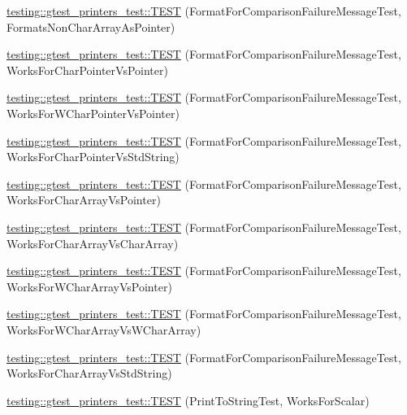 \begin{DoxyCompactItemize}
\item 
\hyperlink{namespacetesting_1_1gtest__printers__test_a3571808f93f419268b6aed1aa127ea30}{testing\+::gtest\+\_\+printers\+\_\+test\+::\+T\+E\+ST} (Format\+For\+Comparison\+Failure\+Message\+Test, Formats\+Non\+Char\+Array\+As\+Pointer)
\item 
\hyperlink{namespacetesting_1_1gtest__printers__test_a1694d4063da702f5379495d3cb2cbc91}{testing\+::gtest\+\_\+printers\+\_\+test\+::\+T\+E\+ST} (Format\+For\+Comparison\+Failure\+Message\+Test, Works\+For\+Char\+Pointer\+Vs\+Pointer)
\item 
\hyperlink{namespacetesting_1_1gtest__printers__test_a735171f4ba0a9dffee9c4c7321107822}{testing\+::gtest\+\_\+printers\+\_\+test\+::\+T\+E\+ST} (Format\+For\+Comparison\+Failure\+Message\+Test, Works\+For\+W\+Char\+Pointer\+Vs\+Pointer)
\item 
\hyperlink{namespacetesting_1_1gtest__printers__test_ab5a910170489276c14b817b70d4feb96}{testing\+::gtest\+\_\+printers\+\_\+test\+::\+T\+E\+ST} (Format\+For\+Comparison\+Failure\+Message\+Test, Works\+For\+Char\+Pointer\+Vs\+Std\+String)
\item 
\hyperlink{namespacetesting_1_1gtest__printers__test_ac25834e0463cf9f3d231db24e7b220e5}{testing\+::gtest\+\_\+printers\+\_\+test\+::\+T\+E\+ST} (Format\+For\+Comparison\+Failure\+Message\+Test, Works\+For\+Char\+Array\+Vs\+Pointer)
\item 
\hyperlink{namespacetesting_1_1gtest__printers__test_aba32640344f0186de5fbb6bb47e0c5a5}{testing\+::gtest\+\_\+printers\+\_\+test\+::\+T\+E\+ST} (Format\+For\+Comparison\+Failure\+Message\+Test, Works\+For\+Char\+Array\+Vs\+Char\+Array)
\item 
\hyperlink{namespacetesting_1_1gtest__printers__test_a1e95289500400eff5fdcd45c5864a6d2}{testing\+::gtest\+\_\+printers\+\_\+test\+::\+T\+E\+ST} (Format\+For\+Comparison\+Failure\+Message\+Test, Works\+For\+W\+Char\+Array\+Vs\+Pointer)
\item 
\hyperlink{namespacetesting_1_1gtest__printers__test_af4b502fb5745d2ee0bfb81d1c8eb95f6}{testing\+::gtest\+\_\+printers\+\_\+test\+::\+T\+E\+ST} (Format\+For\+Comparison\+Failure\+Message\+Test, Works\+For\+W\+Char\+Array\+Vs\+W\+Char\+Array)
\item 
\hyperlink{namespacetesting_1_1gtest__printers__test_ac2300073f401f783ff7b1ef97d2cbd6d}{testing\+::gtest\+\_\+printers\+\_\+test\+::\+T\+E\+ST} (Format\+For\+Comparison\+Failure\+Message\+Test, Works\+For\+Char\+Array\+Vs\+Std\+String)
\item 
\hyperlink{namespacetesting_1_1gtest__printers__test_a5d1bc4b12c18ccaec2ced9f45c092567}{testing\+::gtest\+\_\+printers\+\_\+test\+::\+T\+E\+ST} (Print\+To\+String\+Test, Works\+For\+Scalar)

\end{DoxyCompactItemize}
